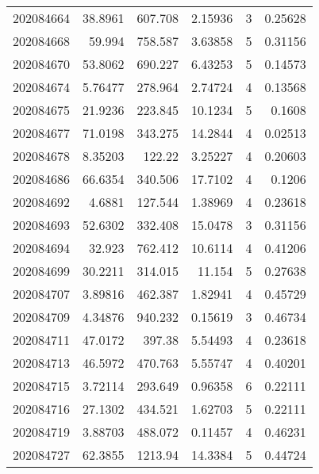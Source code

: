 \begin{tabular}{rrrrrr}
 202084664 &         38.8961  &      607.708  &            2.15936 &           3 & 0.25628 \\
 202084668 &         59.994   &      758.587  &            3.63858 &           5 & 0.31156 \\
 202084670 &         53.8062  &      690.227  &            6.43253 &           5 & 0.14573 \\
 202084674 &          5.76477 &      278.964  &            2.74724 &           4 & 0.13568 \\
 202084675 &         21.9236  &      223.845  &           10.1234  &           5 & 0.1608  \\
 202084677 &         71.0198  &      343.275  &           14.2844  &           4 & 0.02513 \\
 202084678 &          8.35203 &      122.22   &            3.25227 &           4 & 0.20603 \\
 202084686 &         66.6354  &      340.506  &           17.7102  &           4 & 0.1206  \\
 202084692 &          4.6881  &      127.544  &            1.38969 &           4 & 0.23618 \\
 202084693 &         52.6302  &      332.408  &           15.0478  &           3 & 0.31156 \\
 202084694 &         32.923   &      762.412  &           10.6114  &           4 & 0.41206 \\
 202084699 &         30.2211  &      314.015  &           11.154   &           5 & 0.27638 \\
 202084707 &          3.89816 &      462.387  &            1.82941 &           4 & 0.45729 \\
 202084709 &          4.34876 &      940.232  &            0.15619 &           3 & 0.46734 \\
 202084711 &         47.0172  &      397.38   &            5.54493 &           4 & 0.23618 \\
 202084713 &         46.5972  &      470.763  &            5.55747 &           4 & 0.40201 \\
 202084715 &          3.72114 &      293.649  &            0.96358 &           6 & 0.22111 \\
 202084716 &         27.1302  &      434.521  &            1.62703 &           5 & 0.22111 \\
 202084719 &          3.88703 &      488.072  &            0.11457 &           4 & 0.46231 \\
 202084727 &         62.3855  &     1213.94   &           14.3384  &           5 & 0.44724 \\

\end{tabular}
